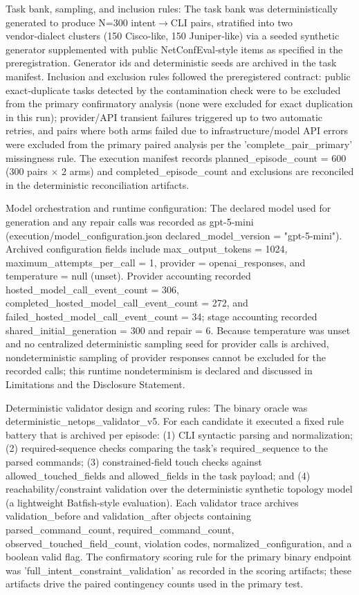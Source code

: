 \documentclass[conference]{IEEEtran}
\begin{document}
Task bank, sampling, and inclusion rules: The task bank was deterministically generated to produce N=300 intent\ensuremath{\rightarrow}CLI pairs, stratified into two vendor‑dialect clusters (150 Cisco‑like, 150 Juniper‑like) via a seeded synthetic generator supplemented with public NetConfEval‑style items as specified in the preregistration. Generator ids and deterministic seeds are archived in the task manifest. Inclusion and exclusion rules followed the preregistered contract: public exact‑duplicate tasks detected by the contamination check were to be excluded from the primary confirmatory analysis (none were excluded for exact duplication in this run); provider/API transient failures triggered up to two automatic retries, and pairs where both arms failed due to infrastructure/model API errors were excluded from the primary paired analysis per the 'complete\_pair\_primary' missingness rule. The execution manifest records planned\_episode\_count = 600 (300 pairs \ensuremath{\times} 2 arms) and completed\_episode\_count and exclusions are reconciled in the deterministic reconciliation artifacts.

Model orchestration and runtime configuration: The declared model used for generation and any repair calls was recorded as gpt-5-mini (execution/model\_configuration.json declared\_model\_version = "gpt-5-mini"). Archived configuration fields include max\_output\_tokens = 1024, maximum\_attempts\_per\_call = 1, provider = openai\_responses, and temperature = null (unset). Provider accounting recorded hosted\_model\_call\_event\_count = 306, completed\_hosted\_model\_call\_event\_count = 272, and failed\_hosted\_model\_call\_event\_count = 34; stage accounting recorded shared\_initial\_generation = 300 and repair = 6. Because temperature was unset and no centralized deterministic sampling seed for provider calls is archived, nondeterministic sampling of provider responses cannot be excluded for the recorded calls; this runtime nondeterminism is declared and discussed in Limitations and the Disclosure Statement.

Deterministic validator design and scoring rules: The binary oracle was deterministic\_netops\_validator\_v5. For each candidate it executed a fixed rule battery that is archived per episode: (1) CLI syntactic parsing and normalization; (2) required‑sequence checks comparing the task's required\_sequence to the parsed commands; (3) constrained‑field touch checks against allowed\_touched\_fields and allowed\_fields in the task payload; and (4) reachability/constraint validation over the deterministic synthetic topology model (a lightweight Batfish‑style evaluation). Each validator trace archives validation\_before and validation\_after objects containing parsed\_command\_count, required\_command\_count, observed\_touched\_field\_count, violation codes, normalized\_configuration, and a boolean valid flag. The confirmatory scoring rule for the primary binary endpoint was 'full\_intent\_constraint\_validation' as recorded in the scoring artifacts; these artifacts drive the paired contingency counts used in the primary test.
\end{document}
